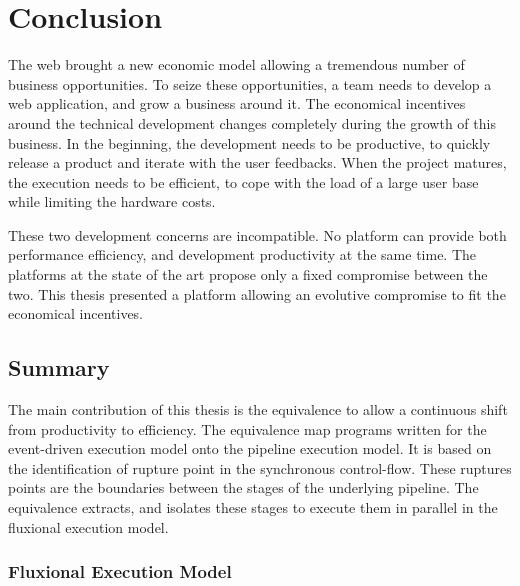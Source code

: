 \chapter{Conclusion} \label{chapter7}
\minitoc
\eject

The web brought a new economic model allowing a tremendous number of business opportunities.
To seize these opportunities, a team needs to develop a web application, and grow a business around it.
The economical incentives around the technical development changes completely during the growth of this business.
In the beginning, the development needs to be productive, to quickly release a product and iterate with the user feedbacks.
When the project matures, the execution needs to be efficient, to cope with the load of a large user base while limiting the hardware costs.

These two development concerns are incompatible.
No platform can provide both performance efficiency, and development productivity at the same time.
The platforms at the state of the art propose only a fixed compromise between the two.
This thesis presented a platform allowing an evolutive compromise to fit the economical incentives.

\section{Summary}

The main contribution of this thesis is the equivalence to allow a continuous shift from productivity to efficiency.
The equivalence map programs written for the event-driven execution model onto the pipeline execution model.
It is based on the identification of rupture point in the synchronous control-flow.
These ruptures points are the boundaries between the stages of the underlying pipeline.
The equivalence extracts, and isolates these stages to execute them in parallel in the fluxional execution model.


\subsection{Fluxional Execution Model} \label{chapter7:conclusion:model}

